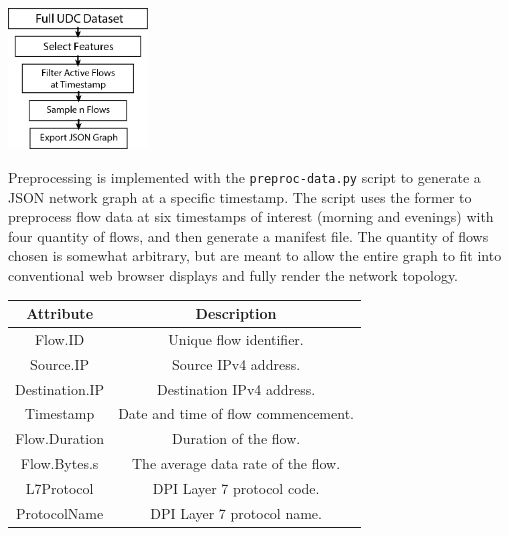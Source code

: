 \documentclass{vgtc}                          %
\begin{document}
\begin{Figure}%
    \centering
    \includegraphics[width=140]{images/cs519-sv_course-project_preprocessing-flow.png}
    \label{fig:preproc-pipeline}
\end{Figure}

Preprocessing is implemented with the \texttt{preproc-data.py} script to generate a JSON network graph at a specific timestamp. The  script uses the former to preprocess flow data at six timestamps of interest (morning and evenings) with four quantity of flows, and then generate a manifest file. The quantity of flows chosen is somewhat arbitrary, but are meant to allow the entire graph to fit into conventional web browser displays and fully render the network topology.

\begin{center}
\begin{tabular}{||c | c ||}
    \hline
    \textbf{Attribute} & \textbf{Description} \\
    \hline\hline
    Flow.ID & Unique flow identifier. \\
    Source.IP & Source IPv4 address. \\
    Destination.IP & Destination IPv4 address. \\
    Timestamp & Date and time of flow commencement. \\
    Flow.Duration & Duration of the flow. \\
    Flow.Bytes.s & The average data rate of the flow. \\
    L7Protocol & DPI Layer 7 protocol code. \\
    ProtocolName & DPI Layer 7 protocol name. \\
    \hline
\end{tabular}
\label{tab:dataset-list-fields}
\end{center}
\end{document}
